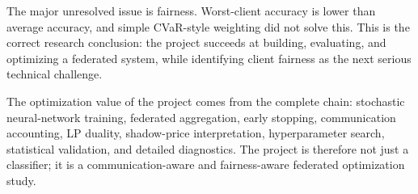 \documentclass[11pt]{report}
\begin{document}
The major unresolved issue is fairness. Worst-client accuracy is lower than average accuracy, and
simple CVaR-style weighting did not solve this. This is the correct research conclusion: the project
succeeds at building, evaluating, and optimizing a federated system, while identifying client
fairness as the next serious technical challenge.

The optimization value of the project comes from the complete chain: stochastic neural-network
training, federated aggregation, early stopping, communication accounting, LP duality, shadow-price
interpretation, hyperparameter search, statistical validation, and detailed diagnostics. The project
is therefore not just a classifier; it is a communication-aware and fairness-aware federated
optimization study.
\end{document}
